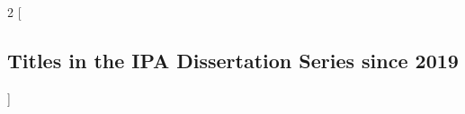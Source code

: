 %
%
%
%
%
%
%
%


\newcommand*{\promitem}[4]{\noindent \textbf{#1}. \emph{#2}. #3.~\mbox{#4}\medskip}

\clearpage \pagestyle{empty}

\setlength{\columnsep}{2em}
\begin{multicols}{2}
        [\subsection*{Titles in the IPA Dissertation Series since 2019}]












\end{multicols}
